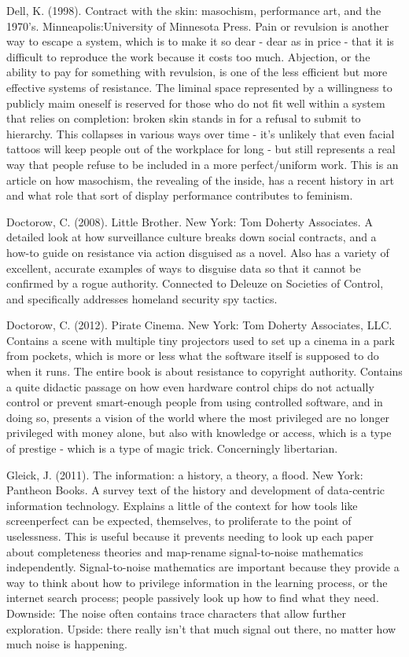 Dell, K. (1998). Contract with the skin: masochism, performance art, and the 1970's. Minneapolis:University of Minnesota Press.
	Pain or revulsion is another way to escape a system, which is to make it so dear - dear as in price - that it is difficult to reproduce the work because it costs too much. Abjection, or the ability to pay for something with revulsion, is one of the less efficient but more effective systems of resistance. The liminal space represented by a willingness to publicly maim oneself is reserved for those who do not fit well within a system that relies on completion: broken skin stands in for a refusal to submit to hierarchy. 
This collapses in various ways over time - it's unlikely that even facial tattoos will keep people out of the workplace for long - but still represents a real way that people refuse to be included in a more perfect/uniform work. This is an article on how masochism, the revealing of the inside, has a recent history in art and what role that sort of display performance contributes to feminism.
	

Doctorow, C. (2008). Little Brother. New York: Tom Doherty Associates.
	A detailed look at how surveillance culture breaks down social contracts, and a how-to guide on resistance via action disguised as a novel. Also has a variety of excellent, accurate examples of ways to disguise data so that it cannot be confirmed by a rogue authority. Connected to Deleuze on Societies of Control, and specifically addresses homeland security spy tactics.

Doctorow, C. (2012). Pirate Cinema. New York: Tom Doherty Associates, LLC.
	Contains a scene with multiple tiny projectors used to set up a cinema in a park from pockets, which is more or less what the software itself is supposed to do when it runs. The entire book is about resistance to copyright authority. Contains a quite didactic passage on how even hardware control chips do not actually control or prevent smart-enough people from using controlled software, and in doing so, presents a vision of the world where the most privileged are no longer privileged with money alone, but also with knowledge or access, which is a type of prestige - which is a type of magic trick. Concerningly libertarian.

Gleick, J. (2011). The information: a history, a theory, a flood. New York: Pantheon Books.
	A survey text of the history and development of data-centric information technology. Explains a little of the context for how tools like screenperfect can be expected, themselves, to proliferate to the point of uselessness. This is useful because it prevents needing to look up each paper about completeness theories and map-rename signal-to-noise mathematics independently. Signal-to-noise mathematics are important because they provide a way to think about how to privilege information in the learning process, or the internet search process; people passively look up how to find what they need. Downside: The noise often contains trace characters that allow further exploration. Upside: there really isn't that much signal out there, no matter how much noise is happening.

